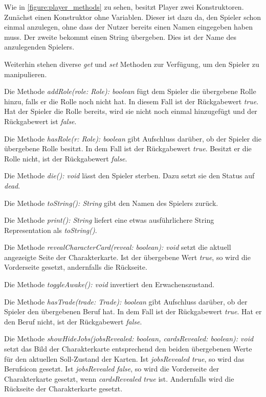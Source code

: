 Wie in \autoref{figure:player_methods} zu sehen, besitzt Player zwei Konstruktoren. Zunächst einen Konstruktor ohne Variablen. Dieser ist dazu da, den Spieler schon einmal anzulegen, ohne dass der Nutzer bereits einen Namen eingegeben haben muss. Der zweite bekommt einen String übergeben. Dies ist der Name des anzulegenden Spielers. 

\medskip
Weiterhin stehen diverse \textit{get} und \textit{set} Methoden zur Verfügung, um den Spieler zu manipulieren. 

\medskip
Die Methode \textit{addRole(role: Role): boolean} fügt dem Spieler die übergebene Rolle hinzu, falls er die Rolle noch nicht hat. In diesem Fall ist der Rückgabewert \textit{true}. Hat der Spieler die Rolle bereits, wird sie nicht noch einmal hinzugefügt und der Rückgabewert ist \textit{false}. 

\medskip
Die Methode \textit{hasRole(r: Role): boolean} gibt Aufschluss darüber, ob der Spieler die übergebene Rolle besitzt. In dem Fall ist der Rückgabewert \textit{true}. Besitzt er die Rolle nicht, ist der Rückgabewert \textit{false}. 

\medskip
Die Methode \textit{die(): void} lässt den Spieler sterben. Dazu setzt sie den Status auf \textit{dead}. 

\medskip
Die Methode \textit{toString(): String} gibt den Namen des Spielers zurück. 

\medskip
Die Methode \textit{print(): String} liefert eine etwas ausführlichere String Representation als \textit{toString()}. 

\medskip
Die Methode \textit{revealCharacterCard(reveal: boolean): void} setzt die aktuell angezeigte Seite der Charakterkarte. Ist der übergebene Wert \textit{true}, so wird die Vorderseite gesetzt, andernfalls die Rückseite. 

\medskip
Die Methode \textit{toggleAwake(): void} invertiert den Erwachenszustand. 

\medskip
Die Methode \textit{hasTrade(trade: Trade): boolean} gibt Aufschluss darüber, ob der Spieler den übergebenen Beruf hat. In dem Fall ist der Rückgabewert \textit{true}. Hat er den Beruf nicht, ist der Rückgabewert \textit{false}. 

\medskip
Die Methode \textit{showHideJobs(jobsRevealed: boolean, cardsRevealed: boolean): void} setzt das Bild der Charakterkarte entsprechend den beiden übergebenen Werte für den aktuellen Soll-Zustand der Karten. Ist \textit{jobsRevealed} \textit{true}, so wird das Berufsicon gesetzt. Ist \textit{jobsRevealed} \textit{false}, so wird die Vorderseite der Charakterkarte gesetzt, wenn \textit{cardsRevealed} \textit{true} ist. Andernfalls wird die Rückseite der Charakterkarte gesetzt. 

